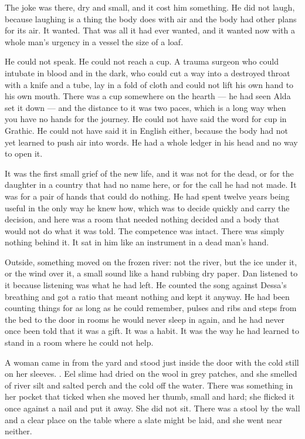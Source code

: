 The joke was there, dry and small, and it cost him something. He did not laugh, because laughing is a thing the body does with air and the body had other plans for its air. It wanted. That was all it had ever wanted, and it wanted now with a whole man's urgency in a vessel the size of a loaf.

He could not speak. He could not reach a cup. A trauma surgeon who could intubate in blood and in the dark, who could cut a way into a destroyed throat with a knife and a tube, lay in a fold of cloth and could not lift his own hand to his own mouth. There was a cup somewhere on the hearth --- he had seen Alda set it down --- and the distance to it was two paces, which is a long way when you have no hands for the journey. He could not have said the word for cup in Grathic. He could not have said it in English either, because the body had not yet learned to push air into words. He had a whole ledger in his head and no way to open it.

It was the first small grief of the new life, and it was not for the dead, or for the daughter in a country that had no name here, or for the call he had not made. It was for a pair of hands that could do nothing. He had spent twelve years being useful in the only way he knew how, which was to decide quickly and carry the decision, and here was a room that needed nothing decided and a body that would not do what it was told. The competence was intact. There was simply nothing behind it. It sat in him like an instrument in a dead man's hand.

Outside, something moved on the frozen river: not the river, but the ice under it, or the wind over it, a small sound like a hand rubbing dry paper. Dan listened to it because listening was what he had left. He counted the song against Dessa's breathing and got a ratio that meant nothing and kept it anyway. He had been counting things for as long as he could remember, pulses and ribs and steps from the bed to the door in rooms he would never sleep in again, and he had never once been told that it was a gift. It was a habit. It was the way he had learned to stand in a room where he could not help.

A woman came in from the yard and stood just inside the door with the cold still on her sleeves. . Eel slime had dried on the wool in grey patches, and she smelled of river silt and salted perch and the cold off the water. There was something in her pocket that ticked when she moved her thumb, small and hard; she flicked it once against a nail and put it away. She did not sit. There was a stool by the wall and a clear place on the table where a slate might be laid, and she went near neither.

